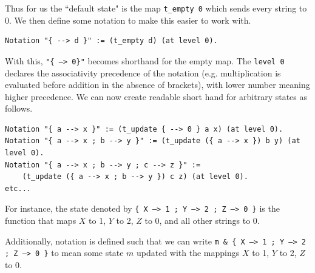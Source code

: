 \documentclass[12pt,notitlepage]{report}
\theoremstyle{plain}
\theoremstyle{definition}
\numberwithin{equation}{section}
\begin{document}
Thus for us the ``default state" is the map \texttt{t\_empty 0} which sends every string to 0.  We then define some notation to make this easier to work with.

\begin{verbatim}
Notation "{ --> d }" := (t_empty d) (at level 0).
\end{verbatim}

With this, \texttt{"\{ --> 0\}"} becomes shorthand for the empty map.  The \texttt{level 0} declares the associativity precedence of the notation (e.g. multiplication is evaluated before addition in the absence of brackets), with lower number meaning higher precedence.  We can now create readable short hand for arbitrary states as follows.

\begin{verbatim}
Notation "{ a --> x }" := (t_update { --> 0 } a x) (at level 0).
Notation "{ a --> x ; b --> y }" := (t_update ({ a --> x }) b y) (at level 0).
Notation "{ a --> x ; b --> y ; c --> z }" := 
    (t_update ({ a --> x ; b --> y }) c z) (at level 0). 
etc...
\end{verbatim}

For instance, the state denoted by \texttt{\{ X --> 1 ; Y --> 2 ; Z --> 0 \}} is the function that maps $X$ to 1, $Y$ to 2, $Z$ to 0, and all other strings to 0.

\par Additionally, notation is defined such that we can write \texttt{m \& \{ X --> 1 ; Y --> 2 ; Z --> 0 \}} to mean some state $m$ updated with the mappings $X$ to 1, $Y$ to 2, $Z$ to 0.
\end{document}
